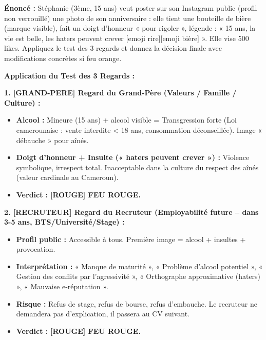 \documentclass[11pt]{article}
\begin{document}
\begin{exoresolu}
\textbf{Énoncé :} Stéphanie (3ème, 15 ans) veut poster sur son Instagram public (profil non verrouillé) une photo de son anniversaire : elle tient une bouteille de bière (marque visible), fait un doigt d'honneur « pour rigoler », légende : « 15 ans, la vie est belle, les haters peuvent crever [emoji rire][emoji bière] ». Elle vise 500 likes. Appliquez le test des 3 regards et donnez la décision finale avec modifications concrètes si feu orange.

\tcblower
\textbf{Application du Test des 3 Regards :}

\textbf{1. [GRAND-PERE] Regard du Grand-Père (Valeurs / Famille / Culture) :}
\begin{itemize}
    \item \textbf{Alcool :} Mineure (15 ans) + alcool visible = Transgression forte (Loi camerounaise : vente interdite < 18 ans, consommation déconseillée). Image « débauche » pour aînés.
    \item \textbf{Doigt d'honneur + Insulte (« haters peuvent crever ») :} Violence symbolique, irrespect total. Inacceptable dans la culture du respect des aînés (valeur cardinale au Cameroun).
    \item \textbf{Verdict :} \textbf{[ROUGE] FEU ROUGE.}
\end{itemize}

\textbf{2. [RECRUTEUR] Regard du Recruteur (Employabilité future -- dans 3-5 ans, BTS/Université/Stage) :}
\begin{itemize}
    \item \textbf{Profil public :} Accessible à tous. Première image = alcool + insultes + provocation.
    \item \textbf{Interprétation :} « Manque de maturité », « Problème d'alcool potentiel », « Gestion des conflits par l'agressivité », « Orthographe approximative (haters) », « Mauvaise e-réputation ».
    \item \textbf{Risque :} Refus de stage, refus de bourse, refus d'embauche. Le recruteur ne demandera pas d'explication, il passera au CV suivant.
    \item \textbf{Verdict :} \textbf{[ROUGE] FEU ROUGE.}
\end{itemize}


\end{exoresolu}
\end{document}
